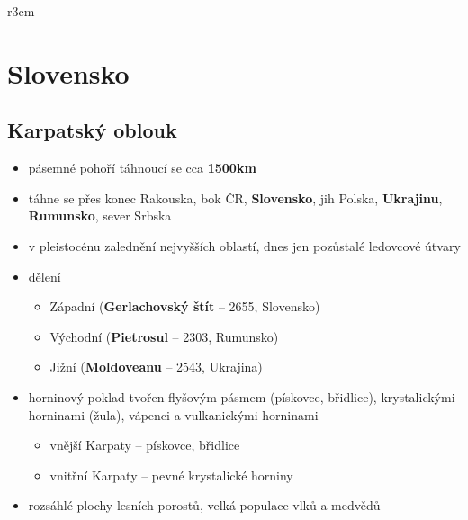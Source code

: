 \newpage
\mbox{}
\vspace{-1.5cm}
\begin{wrapfigure}{r}{3cm}
\vspace{-200pt}
\end{wrapfigure}	
\section{Slovensko} 
\subsection{Karpatský oblouk}
\begin{itemize}
\item pásemné pohoří táhnoucí se cca \textbf{1500km}
\item táhne se přes konec Rakouska, bok ČR, \textbf{Slovensko}, jih Polska, \textbf{Ukrajinu}, \textbf{Rumunsko}, sever Srbska
\item v pleistocénu zalednění nejvyšších oblastí, dnes jen pozůstalé ledovcové útvary
\item dělení
\begin{itemize}
\item Západní (\textbf{Gerlachovský štít} -- 2655, Slovensko)
\item Východní (\textbf{Pietrosul} -- 2303, Rumunsko)
\item Jižní (\textbf{Moldoveanu} -- 2543, Ukrajina)
\end{itemize}
\item horninový poklad tvořen flyšovým pásmem (pískovce, břidlice), krystalickými horninami (žula), vápenci a vulkanickými horninami
\begin{itemize}
\item vnější Karpaty -- pískovce, břidlice
\item vnitřní Karpaty -- pevné krystalické horniny
\end{itemize}
\item rozsáhlé plochy lesních porostů, velká populace vlků a medvědů
\end{itemize}



